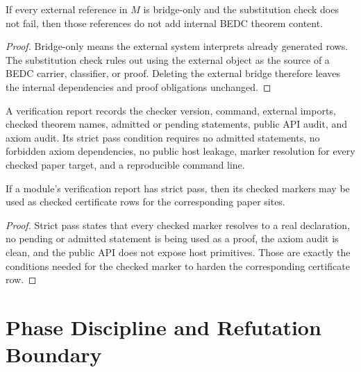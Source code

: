 \begin{theorem}
\label{thm:mature-bridge-spine-bridge-only-conservative}
If every external reference in $M$ is bridge-only and the substitution check
does not fail, then those references do not add internal BEDC theorem content.
\end{theorem}

\begin{proof}
Bridge-only means the external system interprets already generated rows.  The
substitution check rules out using the external object as the source of a BEDC
carrier, classifier, or proof.  Deleting the external bridge therefore leaves
the internal dependencies and proof obligations unchanged.
\end{proof}

\begin{definition}
\label{def:mature-bridge-spine-verification-report}
A verification report records the checker version, command, external imports,
checked theorem names, admitted or pending statements, public API audit, and
axiom audit.  Its strict pass condition requires no admitted statements, no
forbidden axiom dependencies, no public host leakage, marker resolution for
every checked paper target, and a reproducible command line.
\end{definition}

\begin{theorem}
\label{thm:mature-bridge-spine-strict-pass}
If a module's verification report has strict pass, then its checked markers
may be used as checked certificate rows for the corresponding paper sites.
\end{theorem}

\begin{proof}
Strict pass states that every checked marker resolves to a real declaration,
no pending or admitted statement is being used as a proof, the axiom audit is
clean, and the public API does not expose host primitives.  Those are exactly
the conditions needed for the checked marker to harden the corresponding
certificate row.
\end{proof}

\section{Phase Discipline and Refutation Boundary}
\label{sec:mature-bridge-spine-phase-refutation}

